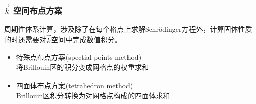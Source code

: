 \documentclass[cjk,slidestop,compress,mathserif,blue]{beamer}
\newcommand{\upcite}[1]{\hspace{0ex}\textsuperscript{\cite{#1}}} %
\begin{document}
\frame
{
\frametitle{$\vec k$ 空间布点方案}
\vskip 10pt
周期性体系计算，涉及除了在每个格点上求解\textrm{Schr\"odinger}方程外，计算固体性质的时还需要对$\vec k$空间中完成数值积分。
\vskip 5pt
\begin{itemize}%
    \item 特殊点布点方案\textrm{(spectial points method)}\\
      将\textrm{Brillouin}区的积分变成网格点的权重求和
    \item 四面体布点方案\textrm{(tetrahedron method)}\upcite{PRB49-16233_1994}\\
	    \textrm{Brillouin}区积分转换为对网格点构成的四面体求和
\end{itemize}
\begin{figure}[h!]
\centering
\vspace*{-0.2in}
\label{Specila_Tetrahedron}
\end{figure}
}
\end{document}
